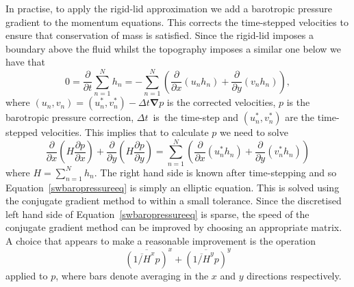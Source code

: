 \documentclass[10pt,a4paper]{report}
\newcommand*\equref[1]{Equation~\eqref{#1}}
\begin{document}
  In practise, to apply the rigid-lid approximation we add a barotropic pressure
  gradient to the momentum equations. This corrects the time-stepped velocities 
  to ensure that conservation of mass is satisfied. Since the rigid-lid imposes a
  boundary above the fluid whilst the topography imposes a similar one below 
  we have that 
  \begin{equation}
  0=\frac{  \partial}{\partial t} \sum^{N}_{n=1} h_{n} = -
  \sum^{N}_{n=1} \left( \frac{\partial }{\partial x} (u_{n}h_{n} )+ 
  \frac{\partial }{\partial y} (v_{n}h_{n} ) \right) ,
  \end{equation}
  where $\left(u_n,v_n\right)=\left(u_n^{*},v^{*}_n\right)-\Delta t \boldsymbol{\nabla}p$
  is the corrected velocities, $p$ is the barotropic pressure correction,
  $\Delta t$~is~the time-step and
  $\left(u_n^{*},v^{*}_n\right)$ are the time-stepped velocities. This implies that to
  calculate $p$ we need to solve 
  \begin{equation}
  \frac{  \partial}{\partial x} \left( H \frac{  \partial p}{\partial x} \right) +
  \frac{  \partial}{\partial y} \left( H \frac{  \partial p}{\partial y} \right) =
  \sum^{N}_{n=1} \left( \frac{\partial }{\partial x} (u^{*}_{n}h_{n} )+ 
  \frac{\partial }{\partial y} (v^{*}_{n}h_{n} ) \right)
  \label{swbaropressureeq}
  \end{equation}
  where $H= \sum^{N}_{n=1} h_{n}$. The right hand side is known after time-stepping 
  and so \equref{swbaropressureeq} is simply an elliptic equation. This is solved using
  the conjugate gradient method to within a small tolerance. Since
  the discretised left hand side of \equref{swbaropressureeq} is sparse, the speed of the 
  conjugate gradient method can be improved by choosing an appropriate matrix.
  A choice that appears to make a reasonable improvement is the operation
  \begin{equation}
  \overline{\left(\overline{1/H}^{x} p\right) }^{x} + \overline{\left(\overline{1/H}^{y} p\right) }^{y}
  \end{equation}
  applied to $p$, where bars denote averaging in the $x$ and $y$ directions respectively.
  
\end{document}

